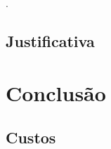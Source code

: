 \documentclass[
	12pt,
	oneside,
	a4paper,
	chapter=TITLE,
	english,
	brazil,
	hidelinks
]{abntex2}
\begin{document}
\blindtext

\begin{citacao}

\blindtext\cite[5.3]{NBR10520:2002}.

\end{citacao}

\section{Justificativa}

\Blindtext

\chapter{Conclusão}

\blindtext

\section{Custos}

\Blindtext

\postextual


\end{document}
